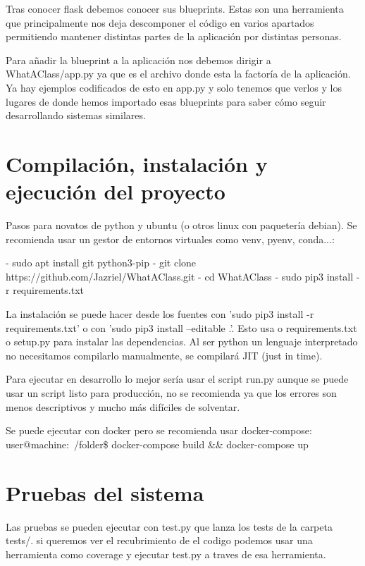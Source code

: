Tras conocer flask debemos conocer sus blueprints. Estas son una herramienta que principalmente nos deja descomponer el código en varios apartados permitiendo mantener distintas partes de la aplicación por distintas personas.

Para añadir la blueprint a la aplicación nos debemos dirigir a WhatAClass/app.py ya que es el archivo donde esta la factoría de la aplicación. Ya hay ejemplos codificados de esto en app.py y solo tenemos que verlos y los lugares de donde hemos importado esas blueprints para saber cómo seguir desarrollando sistemas similares.


 

\section{Compilación, instalación y ejecución del proyecto}

Pasos para novatos de python y ubuntu (o otros linux con paquetería debian). Se recomienda usar un gestor de entornos virtuales como venv, pyenv, conda...:

 - sudo apt install git python3-pip
 - git clone https://github.com/Jazriel/WhatAClass.git
 - cd WhatAClass
 - sudo pip3 install -r requirements.txt

La instalación se puede hacer desde los fuentes con 'sudo pip3 install -r requirements.txt' o con 'sudo pip3 install --editable .'. Esto usa o requirements.txt o setup.py para instalar las dependencias. Al ser python un lenguaje interpretado no necesitamos compilarlo manualmente, se compilará JIT (just in time).

Para ejecutar en desarrollo lo mejor sería usar el script run.py aunque se puede usar un script listo para producción, no se recomienda ya que los errores son menos descriptivos y mucho más difíciles de solventar.

Se puede ejecutar con docker pero se recomienda usar docker-compose:
user@machine:~/folder\$ docker-compose build && docker-compose up 


\section{Pruebas del sistema}

Las pruebas se pueden ejecutar con test.py que lanza los tests de la carpeta tests/. si queremos ver el recubrimiento de el codigo podemos usar una herramienta como coverage y ejecutar test.py a traves de esa herramienta.  